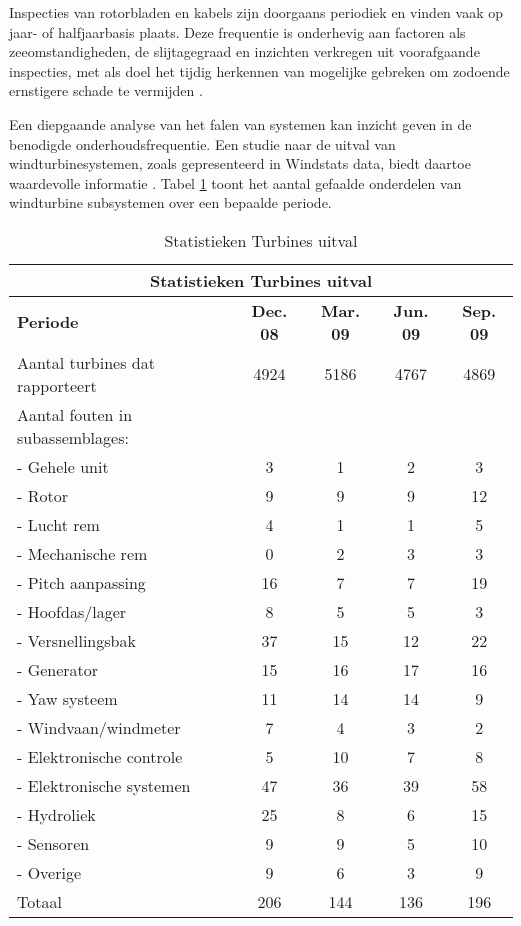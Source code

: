 Inspecties van rotorbladen en kabels zijn doorgaans periodiek en vinden vaak op jaar- of halfjaarbasis plaats. Deze frequentie is onderhevig aan factoren als zeeomstandigheden, de slijtagegraad en inzichten verkregen uit voorafgaande inspecties, met als doel het tijdig herkennen van mogelijke gebreken om zodoende ernstigere schade te vermijden \cite{Eneco_presentatie}.

Een diepgaande analyse van het falen van systemen kan inzicht geven in de benodigde onderhoudsfrequentie. Een studie naar de uitval van windturbinesystemen, zoals gepresenteerd in Windstats data, biedt daartoe waardevolle informatie \cite{ding2010comparative}. Tabel \ref{tab:failure-data} toont het aantal gefaalde onderdelen van windturbine subsystemen over een bepaalde periode.

\begin{table}[h]
    \centering
    \begin{tabular}{|l|c|c|c|c|}
        \hline
        \multicolumn{5}{|c|}{\textbf{Statistieken Turbines uitval}} \\
        \hline
        \textbf{Periode} & \textbf{Dec. 08} & \textbf{Mar. 09} & \textbf{Jun. 09} & \textbf{Sep. 09} \\
        \hline
        Aantal turbines dat rapporteert & 4924 & 5186 & 4767 & 4869 \\
        \hline
        Aantal fouten in subassemblages: & & & & \\
        - Gehele unit & 3 & 1 & 2 & 3 \\
        - Rotor & 9 & 9 & 9 & 12 \\
        - Lucht rem & 4 & 1 & 1 & 5 \\
        - Mechanische rem & 0 & 2 & 3 & 3 \\
        - Pitch aanpassing & 16 & 7 & 7 & 19 \\
        - Hoofdas/lager & 8 & 5 & 5 & 3 \\
        - Versnellingsbak & 37 & 15 & 12 & 22 \\
        - Generator & 15 & 16 & 17 & 16 \\
        - Yaw systeem & 11 & 14 & 14 & 9 \\
        - Windvaan/windmeter & 7 & 4 & 3 & 2 \\
        - Elektronische controle & 5 & 10 & 7 & 8 \\
        - Elektronische systemen & 47 & 36 & 39 & 58 \\
        - Hydroliek & 25 & 8 & 6 & 15 \\
        - Sensoren & 9 & 9 & 5 & 10 \\
        - Overige & 9 & 6 & 3 & 9 \\
        \hline
        Totaal & 206 & 144 & 136 & 196 \\
        \hline
    \end{tabular}
    \caption{Statistieken Turbines uitval\cite{ding2010comparative}}
    \label{tab:failure-data}
\end{table}

